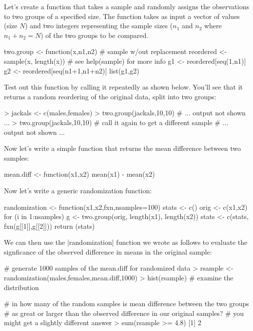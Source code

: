 Let's create a function that takes a sample and randomly assigns the observations to two groups of a specified size. The function takes as input a vector of values (size $N$) and two integers representing the sample sizes ($n_1$ and $n_2$ where $n_1 + n_2 = N$) of the two groups to be compared.

\begin{R}
two.group <- function(x,n1,n2){
  # sample w/out replacement
  reordered <- sample(x, length(x)) # see help(sample) for more info
  g1 <- reordered[seq(1,n1)]
  g2 <- reordered[seq(n1+1,n1+n2)]
  list(g1,g2)
}
\end{R}

Test out this function by calling it repeatedly as shown below. You'll see that it returns a random reordering of the original data, split into two groups:

\begin{R}
> jackals <- c(males,females)
> two.group(jackals,10,10)
# ... output not shown ...
> two.group(jackals,10,10) # call it again to get a different sample
# ... output not shown ...
\end{R}

Now let's write a simple function that returns the mean difference between two samples:

\begin{R}
mean.diff <- function(x1,x2) {
  mean(x1) - mean(x2)
}
\end{R}

Now let's write a generic randomization function:

\begin{R}
randomization <- function(x1,x2,fxn,nsamples=100){
  stats <- c()
  orig <- c(x1,x2)
  for (i in 1:nsamples){
    g <- two.group(orig, length(x1), length(x2))
    stats <- c(stats, fxn(g[[1]],g[[2]]))
  }
  return (stats)
}
\end{R}

We can then use the |randomization| function we wrote as follows to evaluate the signficance of the observed difference in means in the original sample:

\begin{R}
# generate 1000  samples of the mean.diff for randomized data
> rsample <- randomization(males,females,mean.diff,1000)
> hist(rsample)  # examine the distribution

# in how many of the random samples is mean difference between the two groups
# as great or larger than the observed difference in our original samples?
# you might get a slightly different answer
> sum(rsample >= 4.8)
[1] 2
\end{R}


